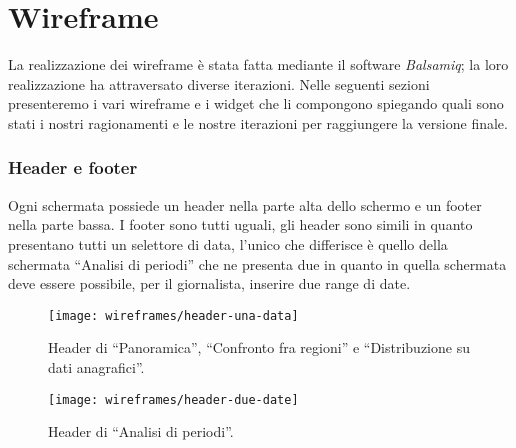 \section{Wireframe}\label{s:wireframe}
La realizzazione dei wireframe è stata fatta mediante il software \textit{Balsamiq}; la loro realizzazione ha attraversato diverse iterazioni. Nelle seguenti sezioni presenteremo i vari wireframe e i widget che li compongono spiegando quali sono stati i nostri ragionamenti e le nostre iterazioni per raggiungere la versione finale.\\

\subsubsection{Header e footer}\label{ss:header-e-footer}
Ogni schermata possiede un header nella parte alta dello schermo e un footer nella parte bassa. I footer sono tutti uguali, gli header sono simili in quanto presentano tutti un selettore di data, l'unico che differisce è quello della schermata ``Analisi di periodi'' che ne presenta due in quanto in quella schermata deve essere possibile, per il giornalista, inserire due range di date.

\begin{figure}[H]
    \centering
    \texttt{[image: wireframes/header-una-data]}
    \caption{Header di ``Panoramica'', ``Confronto fra regioni'' e ``Distribuzione su dati anagrafici''.}
    \label{fig:header-una-data}
\end{figure}

\begin{figure}[H]
    \centering
    \texttt{[image: wireframes/header-due-date]}
    \caption{Header di ``Analisi di periodi''.}
    \label{fig:header-due-date}
\end{figure}


